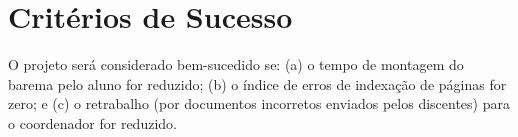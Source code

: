 \chapter{Critérios de Sucesso}
O projeto será considerado bem-sucedido se: (a) o tempo de montagem do barema pelo aluno for reduzido; (b) o índice de erros de indexação de páginas for zero; e (c) o retrabalho (por documentos incorretos enviados pelos discentes) para o coordenador for reduzido.





